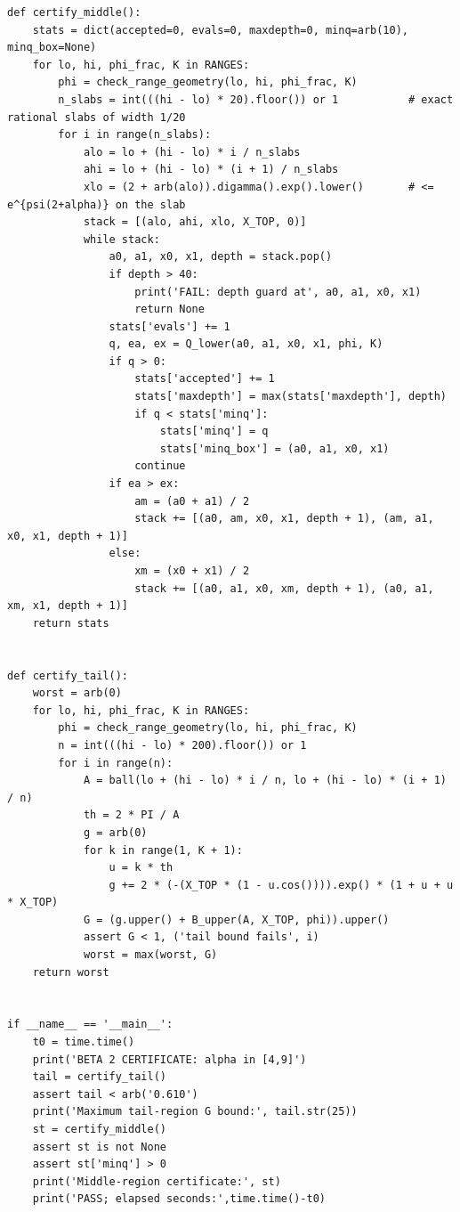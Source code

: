 \documentclass[11pt,a4paper]{article}
\theoremstyle{plain}
\theoremstyle{remark}
\begin{document}
\begin{lstlisting}
def certify_middle():
    stats = dict(accepted=0, evals=0, maxdepth=0, minq=arb(10), minq_box=None)
    for lo, hi, phi_frac, K in RANGES:
        phi = check_range_geometry(lo, hi, phi_frac, K)
        n_slabs = int(((hi - lo) * 20).floor()) or 1           # exact rational slabs of width 1/20
        for i in range(n_slabs):
            alo = lo + (hi - lo) * i / n_slabs
            ahi = lo + (hi - lo) * (i + 1) / n_slabs
            xlo = (2 + arb(alo)).digamma().exp().lower()       # <= e^{psi(2+alpha)} on the slab
            stack = [(alo, ahi, xlo, X_TOP, 0)]
            while stack:
                a0, a1, x0, x1, depth = stack.pop()
                if depth > 40:
                    print('FAIL: depth guard at', a0, a1, x0, x1)
                    return None
                stats['evals'] += 1
                q, ea, ex = Q_lower(a0, a1, x0, x1, phi, K)
                if q > 0:
                    stats['accepted'] += 1
                    stats['maxdepth'] = max(stats['maxdepth'], depth)
                    if q < stats['minq']:
                        stats['minq'] = q
                        stats['minq_box'] = (a0, a1, x0, x1)
                    continue
                if ea > ex:
                    am = (a0 + a1) / 2
                    stack += [(a0, am, x0, x1, depth + 1), (am, a1, x0, x1, depth + 1)]
                else:
                    xm = (x0 + x1) / 2
                    stack += [(a0, a1, x0, xm, depth + 1), (a0, a1, xm, x1, depth + 1)]
    return stats


def certify_tail():
    worst = arb(0)
    for lo, hi, phi_frac, K in RANGES:
        phi = check_range_geometry(lo, hi, phi_frac, K)
        n = int(((hi - lo) * 200).floor()) or 1
        for i in range(n):
            A = ball(lo + (hi - lo) * i / n, lo + (hi - lo) * (i + 1) / n)
            th = 2 * PI / A
            g = arb(0)
            for k in range(1, K + 1):
                u = k * th
                g += 2 * (-(X_TOP * (1 - u.cos()))).exp() * (1 + u + u * X_TOP)
            G = (g.upper() + B_upper(A, X_TOP, phi)).upper()
            assert G < 1, ('tail bound fails', i)
            worst = max(worst, G)
    return worst


if __name__ == '__main__':
    t0 = time.time()
    print('BETA 2 CERTIFICATE: alpha in [4,9]')
    tail = certify_tail()
    assert tail < arb('0.610')
    print('Maximum tail-region G bound:', tail.str(25))
    st = certify_middle()
    assert st is not None
    assert st['minq'] > 0
    print('Middle-region certificate:', st)
    print('PASS; elapsed seconds:',time.time()-t0)

\end{lstlisting}
\end{document}
